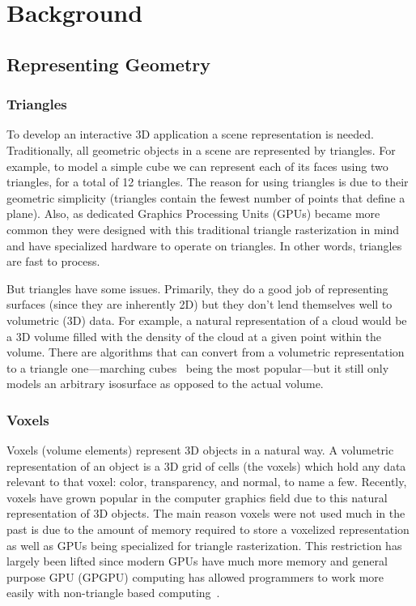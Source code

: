 \chapter{Background}

\section{Representing Geometry}
\subsection{Triangles}
To develop an interactive 3D application a scene representation is needed. Traditionally, all geometric objects in a scene are represented by triangles. For example, to model a simple cube we can represent each of its faces using two triangles, for a total of 12 triangles. The reason for using triangles is due to their geometric simplicity (triangles contain the fewest number of points that define a plane). Also, as dedicated Graphics Processing Units (GPUs) became more common they were designed with this traditional triangle rasterization in mind and have specialized hardware to operate on triangles. In other words, triangles are fast to process.

But triangles have some issues. Primarily, they do a good job of representing surfaces (since they are inherently 2D) but they don't lend themselves well to volumetric (3D) data. For example, a natural representation of a cloud would be a 3D volume filled with the density of the cloud at a given point within the volume. There are algorithms that can convert from a volumetric representation to a triangle one---marching cubes~\cite{Lorensen:1987:MCH:37402.37422} being the most popular---but it still only models an arbitrary isosurface as opposed to the actual volume.

\subsection{Voxels}
Voxels (volume elements) represent 3D objects in a natural way. A volumetric representation of an object is a 3D grid of cells (the voxels) which hold any data relevant to that voxel: color, transparency, and normal, to name a few. Recently, voxels have grown popular in the computer graphics field due to this natural representation of 3D objects. The main reason voxels were not used much in the past is due to the amount of memory required to store a voxelized representation as well as GPUs being specialized for triangle rasterization. This restriction has largely been lifted since modern GPUs have much more memory and general purpose GPU (GPGPU) computing has allowed programmers to work more easily with non-triangle based computing~\cite{Crassin:2009:GRS:1507149.1507152,crassin2012dynamic}.

